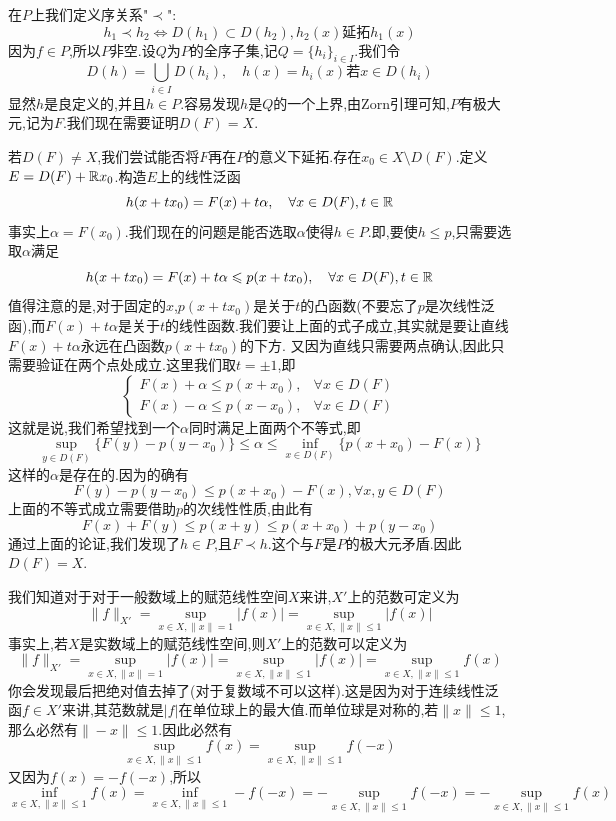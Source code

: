 在$P$上我们定义序关系"$\prec $":
$$
h_1\prec h_2\Leftrightarrow D(h_1)\subset D(h_2),h_2(x)\text{延拓}h_1(x)
$$
因为$f\in P$,所以$P$非空.设$Q$为$P$的全序子集,记$Q=\{h_i\}_{i\in I}$.我们令
$$
D(h)=\bigcup_{i\in I}D(h_i),\quad h(x)=h_i(x)\text{若}x\in D(h_i)
$$
显然$h$是良定义的,并且$h\in P$.容易发现$h$是$Q$的一个上界,由Zorn引理可知,$P$有极大元,记为$F$.我们现在需要证明$D(F)=X$.\par
若$D(F)\neq X$,我们尝试能否将$F$再在$P$的意义下延拓.存在$x_0\in X\setminus D(F)$.定义$E=D(F)+\mathbb{R} x_0$.构造$E$上的线性泛函
$$
h(x+tx_0)=F(x)+t\alpha,\quad \forall x\in D(F),t\in \mathbb{R}
$$
事实上$\alpha=F(x_0)$.我们现在的问题是能否选取$\alpha$使得$h\in P$.即,要使$h\leqslant p$,只需要选取$\alpha$满足
$$
h(x+tx_0)=F(x)+t\alpha\leqslant p(x+tx_0),\quad \forall x\in D(F),t\in \mathbb{R}
$$
值得注意的是,对于固定的$x$,$p(x+tx_0)$是关于$t$的凸函数(不要忘了$p$是次线性泛函),而$F(x)+t\alpha$是关于$t$的线性函数.我们要让上面的式子成立,其实就是要让直线$F(x)+t\alpha$永远在凸函数$p(x+tx_0)$的下方.
又因为直线只需要两点确认,因此只需要验证在两个点处成立.这里我们取$t=\pm 1$,即
$$
\begin{cases}
    F(x)+\alpha \leqslant p(x+x_0),&\forall x\in D(F)\\
    F(x)-\alpha \leqslant p(x-x_0),&\forall x\in D(F)
\end{cases}
$$
这就是说,我们希望找到一个$\alpha$同时满足上面两个不等式,即
$$
\sup_{y\in D(F)}\{F(y)-p(y-x_0)\}\leqslant \alpha \leqslant \inf_{x\in D(F)}\{p(x+x_0)-F(x)\}
$$
这样的$\alpha$是存在的.因为的确有
$$
F(y)-p(y-x_0)\leqslant p(x+x_0)-F(x),\forall x,y\in D(F)
$$
上面的不等式成立需要借助$p$的次线性性质,由此有
$$
F(x)+F(y)\leqslant p(x+y)\leqslant p(x+x_0)+p(y-x_0)
$$
\qquad 通过上面的论证,我们发现了$h\in P$,且$F\prec h$.这个与$F$是$P$的极大元矛盾.因此$D(F)=X$.\par
我们知道对于对于一般数域上的赋范线性空间$X$来讲,$X'$上的范数可定义为
$$
\|f\|_{X'}=\sup_{x\in X,\|x\|=1}|f(x)|=\sup_{x\in X,\|x\|\leqslant 1}|f(x)|
$$
事实上,若$X$是实数域上的赋范线性空间,则$X'$上的范数可以定义为
$$
\|f\|_{X'}=\sup_{x\in X,\|x\|=1}|f(x)|=\sup_{x\in X,\|x\|\leqslant 1}|f(x)|=\sup_{x\in X,\|x\|\leqslant 1}f(x)
$$
你会发现最后把绝对值去掉了(对于复数域不可以这样).这是因为对于连续线性泛函$f\in X'$来讲,其范数就是$|f|$在单位球上的最大值.而单位球是对称的,若$\|x\|\leqslant 1$,那么必然有$\|-x\|\leqslant 1$.因此必然有
$$
\sup_{x\in X,\|x\|\leqslant 1}f(x)=\sup_{x\in X,\|x\|\leqslant 1}f(-x)
$$
又因为$f(x)=-f(-x)$,所以
$$
\inf_{x\in X,\|x\|\leqslant 1}f(x)=\inf_{x\in X,\|x\|\leqslant 1}-f(-x)=-\sup_{x\in X,\|x\|\leqslant 1}f(-x)=-\sup_{x\in X,\|x\|\leqslant 1}f(x)
$$
